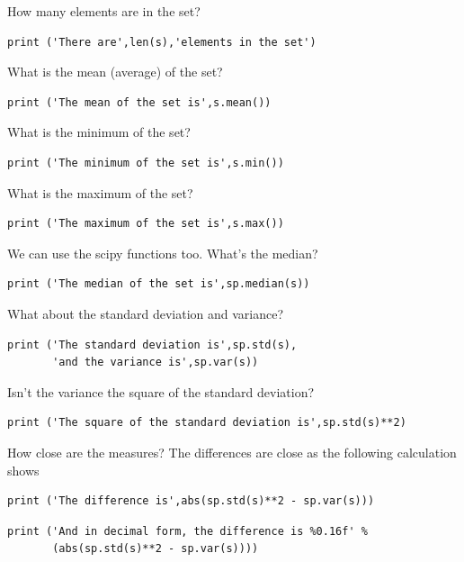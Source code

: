 How many elements are in the set?

\begin{verbatim}
print ('There are',len(s),'elements in the set')
\end{verbatim}

What is the mean (average) of the set?

\begin{verbatim}
print ('The mean of the set is',s.mean())
\end{verbatim}

What is the minimum of the set?

\begin{verbatim}
print ('The minimum of the set is',s.min())
\end{verbatim}

What is the maximum of the set?

\begin{verbatim}
print ('The maximum of the set is',s.max())
\end{verbatim}

We can use the scipy functions too. What's the median?

\begin{verbatim}
print ('The median of the set is',sp.median(s))
\end{verbatim}

What about the standard deviation and variance?

\begin{verbatim}
print ('The standard deviation is',sp.std(s),
       'and the variance is',sp.var(s))
\end{verbatim}

Isn't the variance the square of the standard deviation?

\begin{verbatim}
print ('The square of the standard deviation is',sp.std(s)**2)
\end{verbatim}

How close are the measures? The differences are close as the following
calculation shows

\begin{verbatim}
print ('The difference is',abs(sp.std(s)**2 - sp.var(s)))
\end{verbatim}

\begin{verbatim}
print ('And in decimal form, the difference is %0.16f' % 
       (abs(sp.std(s)**2 - sp.var(s))))
\end{verbatim}

